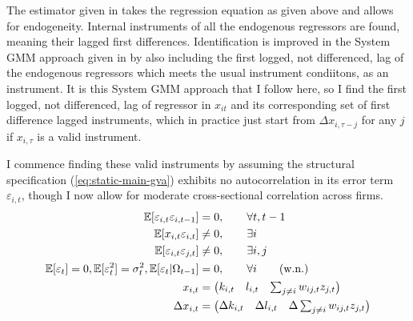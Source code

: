 The estimator given in \citep{Arellano1991} takes the regression equation
as given above and allows for endogeneity.
Internal instruments of all the endogenous regressors are found,
meaning their lagged first differences.
Identification is improved in the System GMM approach given in \citep{Blundell1998}
by also including the first logged, not differenced, lag of the endogenous regressors
which meets the usual instrument condiitons, as an instrument.
It is this System GMM approach that I follow here,
so I find the first logged, not differenced, lag of regressor in $x_{it}$
and its corresponding set of first difference lagged instruments,
which in practice just start from $\Delta x_{i,\tau-j}$ for any $j$
if $x_{i,\tau}$ is a valid instrument.
\par
I commence finding these valid instruments by assuming the structural specification (\ref{eq:static-main-gva})
exhibits no autocorrelation in its error term $\varepsilon_{i,t}$,
though I now allow for moderate cross-sectional correlation across firms.
\begin{align}
    \label{eq:dyn-no-ac}
    \mathbb E[\varepsilon_{i,t}\varepsilon_{i,t-1}] &= 0       ,\qquad \forall t,t-1
    \\
    \label{eq:dyn-contemperaneous-endogeneity}
    \mathbb E[x_{i,t}\varepsilon_{i,t}] &\neq 0              ,\qquad \exists i
    \\
    \label{eq:dyn-xs-corr-errors}
    \mathbb E[\varepsilon_{i,t}\varepsilon_{j,t}] &\neq 0   ,\qquad \exists i,j
    \\
    \label{eq:dyn-error-wn}
    \mathbb E[\varepsilon_t]    =0,
    \mathbb E[\varepsilon_t^2]  =\sigma_t^2,
    \mathbb E[\varepsilon_t|\Omega_{t-1}] &=0                  ,\qquad \forall i
    \qquad\text{(w.n.)}
    \\ \notag
    x_{i,t} &=
    \begin{pmatrix}
        k_{i,t} &   l_{i,t} &   \sum_{j\neq i} w_{ij,t}z_{j,t}
    \end{pmatrix}
    \\ \notag
    \Delta x_{i,t} &=
    \begin{pmatrix}
        \Delta k_{i,t} &   \Delta l_{i,t} &   \Delta \sum_{j\neq i} w_{ij,t}z_{j,t}
    \end{pmatrix}
\end{align}

